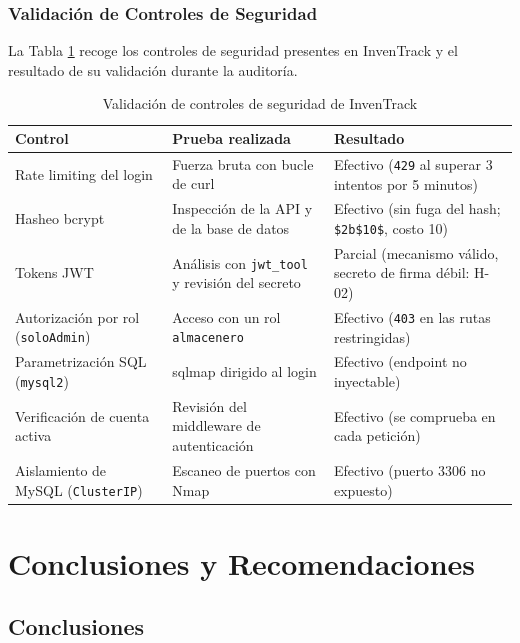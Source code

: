 \documentclass[stu,11pt,spanish,floatsintext]{apa7}
\begin{document}
\subsubsection{Validación de Controles de Seguridad}

La Tabla \ref{tab:controles} recoge los controles de seguridad presentes en InvenTrack y el resultado de su validación durante la auditoría.

\begin{table}[H]
  \centering
  \caption{Validación de controles de seguridad de InvenTrack}
  \label{tab:controles}
  \begin{tabularx}{\textwidth}{p{} X X}
    \toprule
    \textbf{Control} & \textbf{Prueba realizada} & \textbf{Resultado} \\
    \midrule
    Rate limiting del login & Fuerza bruta con bucle de curl & Efectivo (\texttt{429} al superar 3 intentos por 5 minutos) \\
    Hasheo bcrypt & Inspección de la API y de la base de datos & Efectivo (sin fuga del hash; \texttt{\$2b\$10\$}, costo 10) \\
    Tokens JWT & Análisis con \texttt{jwt\_tool} y revisión del secreto & Parcial (mecanismo válido, secreto de firma débil: H-02) \\
    Autorización por rol (\texttt{soloAdmin}) & Acceso con un rol \texttt{almacenero} & Efectivo (\texttt{403} en las rutas restringidas) \\
    Parametrización SQL (\texttt{mysql2}) & sqlmap dirigido al login & Efectivo (endpoint no inyectable) \\
    Verificación de cuenta activa & Revisión del middleware de autenticación & Efectivo (se comprueba en cada petición) \\
    Aislamiento de MySQL (\texttt{ClusterIP}) & Escaneo de puertos con Nmap & Efectivo (puerto 3306 no expuesto) \\
    \bottomrule
  \end{tabularx}
\end{table}

\section{Conclusiones y Recomendaciones}

\subsection{Conclusiones}
\end{document}

